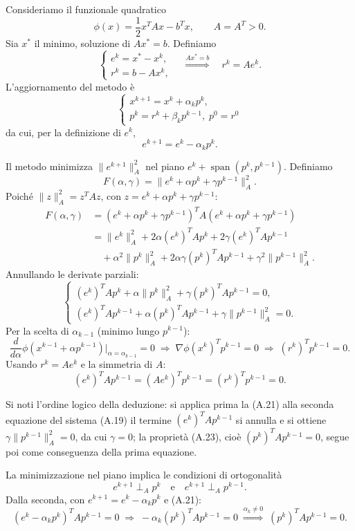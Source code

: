 \documentclass[a4paper,12pt]{article}
\begin{document}
Consideriamo il funzionale quadratico
\[
\phi(x)=\frac12 x^T A x - b^T x, \qquad A=A^T>0. \tag{A.13}
\]
Sia \(x^*\) il minimo, soluzione di \(Ax^*=b\). Definiamo
\[
\begin{cases}
e^k = x^* - x^k, \\
r^k = b - A x^k,
\end{cases}
\quad\overset{Ax^*=b}{\Longrightarrow}\quad
r^k = A e^k. \tag{A.14}
\]
L'aggiornamento del metodo è
\[
\begin{cases}
x^{k+1}=x^k+\alpha_k p^k, \\
p^k=r^k+\beta_k p^{k-1},\; p^0=r^0
\end{cases}
\tag{A.15}
\]
da cui, per la definizione di $e^k$,
\[
e^{k+1}=e^k-\alpha_k p^k. \tag{A.16}
\]

Il metodo minimizza \(\|e^{k+1}\|_A^2\) nel piano \(e^k+\operatorname{span}(p^k,p^{k-1})\).  
Definiamo
\[
F(\alpha,\gamma)=\|e^k+\alpha p^k+\gamma p^{k-1}\|_A^2. \tag{A.17}
\]
Poiché \(\|z\|_A^2 = z^T A z\), con \(z=e^k+\alpha p^k+\gamma p^{k-1}\):
\[
\begin{aligned}
F(\alpha,\gamma)
&= (e^k+\alpha p^k+\gamma p^{k-1})^T A (e^k+\alpha p^k+\gamma p^{k-1}) \\
&= \|e^k\|_A^2+2\alpha(e^k)^T A p^k+2\gamma(e^k)^T A p^{k-1}\\
&\quad+\alpha^2\|p^k\|_A^2+2\alpha\gamma(p^k)^T A p^{k-1}+\gamma^2\|p^{k-1}\|_A^2.
\end{aligned} \tag{A.18}
\]
Annullando le derivate parziali:
\[
\begin{cases}
(e^k)^T A p^k+\alpha\|p^k\|_A^2+\gamma(p^k)^T A p^{k-1}=0,\\[2pt]
(e^k)^T A p^{k-1}+\alpha(p^k)^T A p^{k-1}+\gamma\|p^{k-1}\|_A^2=0.
\end{cases} \tag{A.19}
\]
Per la scelta di \(\alpha_{k-1}\) (minimo lungo \(p^{k-1}\)):
\[
\frac{d}{d\alpha}\phi(x^{k-1}+\alpha p^{k-1})\big|_{\alpha=\alpha_{k-1}}=0
\;\Longrightarrow\;
\nabla\phi(x^k)^T p^{k-1}=0
\;\Longrightarrow\;
(r^k)^T p^{k-1}=0. \tag{A.20}
\]
Usando \(r^k=Ae^k\) e la simmetria di \(A\):
\[
(e^k)^T A p^{k-1}=(Ae^k)^T p^{k-1}=(r^k)^T p^{k-1}=0. \tag{A.21}
\]

Si noti l'ordine logico della deduzione: si applica prima la (A.21) alla seconda equazione del sistema (A.19) il termine $(e^k)^T A p^{k-1}$ si annulla e si ottiene \(\gamma\|p^{k-1}\|_A^2 = 0\), da cui \(\gamma = 0\); la proprietà (A.23), cioè \((p^k)^T A p^{k-1} = 0\), segue poi come conseguenza della prima equazione.

La minimizzazione nel piano implica le condizioni di ortogonalità
\[
e^{k+1} \perp_A p^k \quad \text{e} \quad e^{k+1} \perp_A p^{k-1}. \tag{A.22}
\]
Dalla seconda, con \(e^{k+1}=e^k-\alpha_k p^k\) e (A.21):
\[
(e^k-\alpha_k p^k)^T A p^{k-1}=0
\;\Longrightarrow\;
-\alpha_k (p^k)^T A p^{k-1}=0
\;\overset{\alpha_k\neq0}{\Longrightarrow}\;
(p^k)^T A p^{k-1}=0. \tag{A.23}
\]
\end{document}
